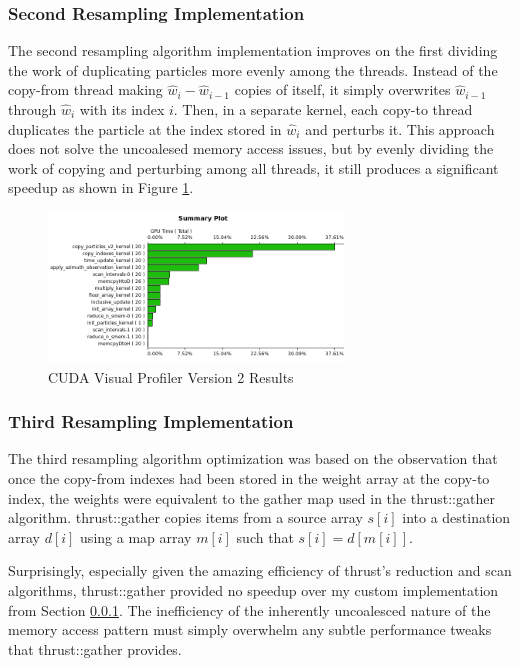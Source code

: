 \documentclass{article}
\begin{document}
\subsubsection{Second Resampling Implementation}\label{resamplesection2}

The second resampling algorithm implementation improves on the first dividing the work of duplicating particles more evenly among the threads. Instead of the copy-from thread making \(\hat{w}_{i}-\hat{w}_{i-1}\) copies of itself, it simply overwrites \(\hat{w}_{i-1}\) through \(\hat{w}_{i}\) with its index \(i\). Then, in a separate kernel, each copy-to thread duplicates the particle at the index stored in \(\hat{w}_{i}\) and perturbs it. This approach does not solve the uncoalesed memory access issues, but by evenly dividing the work of copying and perturbing among all threads, it still produces a significant speedup as shown in Figure \ref{profiler2}.

\begin{figure}
\centering
\includegraphics[width=0.7\textwidth]{data/profile_cuda_version2_pic1.png}
\caption{CUDA Visual Profiler Version 2 Results}
\label{profiler2}
\end{figure}

\subsubsection{Third Resampling Implementation}
The third resampling algorithm optimization was based on the observation that once the copy-from indexes had been stored in the weight array at the copy-to index, the weights were equivalent to the gather map used in the thrust::gather algorithm. \cite{thrust} thrust::gather copies items from a source array \(s[i]\) into a destination array \(d[i]\) using a map array \(m[i]\) such that \(s[i]=d[m[i]]\).

Surprisingly, especially given the amazing efficiency of thrust's reduction and scan algorithms, thrust::gather provided no speedup over my custom implementation from Section \ref{resamplesection2}. The inefficiency of the inherently uncoalesced nature of the memory access pattern must simply overwhelm any subtle performance tweaks that thrust::gather provides.
\end{document}
